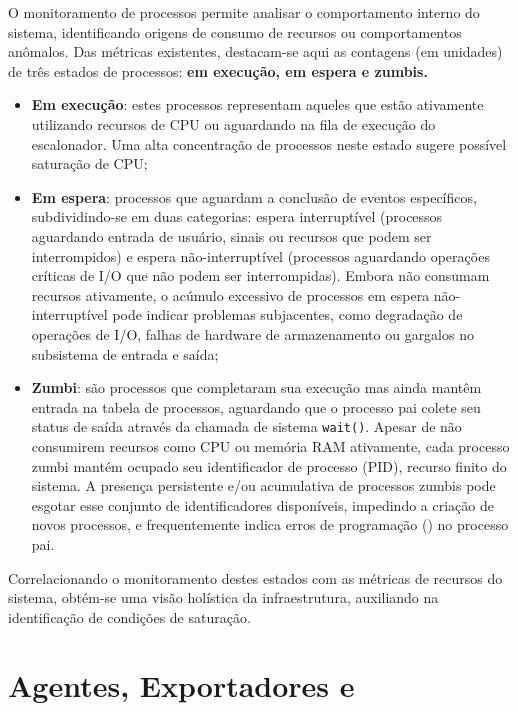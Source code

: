 {\color{red}

O monitoramento de processos permite analisar o comportamento interno do sistema, identificando origens de consumo de recursos ou comportamentos anômalos. Das métricas existentes, destacam-se aqui as contagens (em unidades) de três estados de processos: \textbf{em execução, em espera e zumbis.}

\begin{itemize}
    \item {\textbf{Em execução}}: estes processos representam aqueles que estão ativamente utilizando recursos de CPU ou aguardando na fila de execução do escalonador. Uma alta concentração de processos neste estado sugere possível saturação de CPU;
    \item {\textbf{Em espera}}: processos que aguardam a conclusão de eventos específicos, subdividindo-se em duas categorias: espera interruptível (processos aguardando entrada de usuário, sinais ou recursos que podem ser interrompidos) e espera não-interruptível (processos aguardando operações críticas de I/O que não podem ser interrompidas). Embora não consumam recursos ativamente, o acúmulo excessivo de processos em espera não-interruptível pode indicar problemas subjacentes, como degradação de operações de I/O, falhas de hardware de armazenamento ou gargalos no subsistema de entrada e saída;
    \item {\textbf{Zumbi}}: são processos que completaram sua execução mas ainda mantêm entrada na tabela de processos, aguardando que o processo pai colete seu status de saída através da chamada de sistema \verb|wait()|. Apesar de não consumirem recursos como CPU ou memória RAM ativamente, cada processo zumbi mantém ocupado seu identificador de processo (PID), recurso finito do sistema. A presença persistente e/ou acumulativa de processos zumbis pode esgotar esse conjunto de identificadores disponíveis, impedindo a criação de novos processos, e frequentemente indica erros de programação () no processo pai.
\end{itemize}

Correlacionando o monitoramento destes estados com as métricas de recursos do sistema, obtém-se uma visão holística da infraestrutura, auxiliando na identificação de condições de saturação.

}


\section{Agentes, Exportadores e }
\label{section:Agentes}

